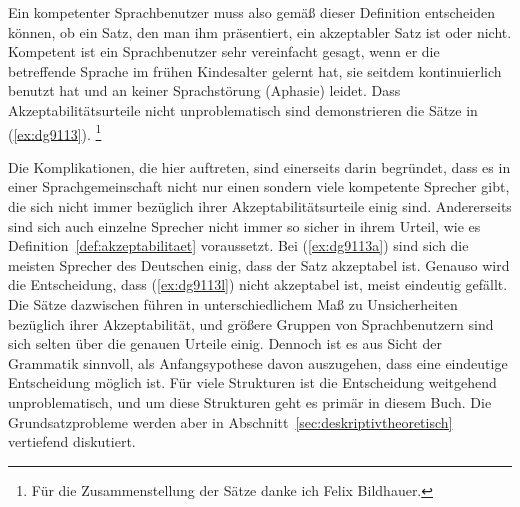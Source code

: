 
Ein kompetenter Sprachbenutzer muss also gemäß dieser Definition entscheiden können, ob ein Satz, den man ihm präsentiert, ein akzeptabler Satz ist oder nicht.
Kompetent ist ein Sprachbenutzer sehr vereinfacht gesagt, wenn er die betreffende Sprache im frühen Kindesalter gelernt hat, sie seitdem kontinuierlich benutzt hat und an keiner Sprachstörung (Aphasie) leidet.
Dass Akzeptabilitätsurteile nicht unproblematisch sind demonstrieren die Sätze in (\ref{ex:dg9113}).%
\footnote{Für die Zusammenstellung der Sätze danke ich Felix Bildhauer.}

\begin{exe}
  \ex\label{ex:dg9113}
  \begin{xlist}
  \end{xlist}
\end{exe}

Die Komplikationen, die hier auftreten, sind einerseits darin begründet, dass es in einer Sprachgemeinschaft nicht nur einen sondern viele kompetente Sprecher gibt, die sich nicht immer bezüglich ihrer Akzeptabilitätsurteile einig sind.  
Andererseits sind sich auch einzelne Sprecher nicht immer so sicher in ihrem Urteil, wie es Definition~\ref{def:akzeptabilitaet} voraussetzt.
Bei (\ref{ex:dg9113a}) sind sich die meisten Sprecher des Deutschen einig, dass der Satz akzeptabel ist.
Genauso wird die Entscheidung, dass (\ref{ex:dg9113l}) nicht akzeptabel ist, meist eindeutig gefällt.
Die Sätze dazwischen führen in unterschiedlichem Maß zu Unsicherheiten bezüglich ihrer Akzeptabilität, und größere Gruppen von Sprachbenutzern sind sich selten über die genauen Urteile einig.
Dennoch ist es aus Sicht der Grammatik sinnvoll, als Anfangsypothese davon auszugehen, dass eine eindeutige Entscheidung möglich ist.
Für viele Strukturen ist die Entscheidung weitgehend unproblematisch, und um diese Strukturen geht es primär in diesem Buch.
Die Grundsatzprobleme werden aber in Abschnitt~\ref{sec:deskriptivtheoretisch} vertiefend diskutiert.

